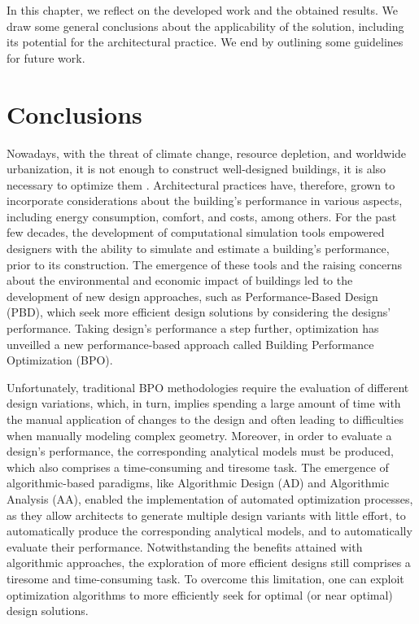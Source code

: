 \label{chap:conclusion}

In this chapter, we reflect on the developed work and the obtained results. We draw some general conclusions about the applicability of the solution, including its potential for the architectural practice. We end by outlining some guidelines for future work. 

\section{Conclusions}
Nowadays, with the threat of climate change, resource depletion, and worldwide urbanization, it is not enough to construct well-designed buildings, it is also necessary to optimize them \cite{Wortmann2015AdvSBO}. Architectural practices have, therefore, grown to incorporate considerations about the building's performance in various aspects, including energy consumption, comfort, and costs, among others. For the past few decades, the development of computational simulation tools empowered designers with the ability to simulate and estimate a building’s performance, prior to its construction. The emergence of these tools and the raising concerns about the environmental and economic impact of buildings led to the development of new design approaches, such as Performance-Based Design (\ac{PBD}), which seek more efficient design solutions by considering the designs’ performance. Taking design’s performance a step further, optimization has unveilled a new performance-based approach called Building Performance Optimization (\ac{BPO}). 

Unfortunately, traditional \ac{BPO} methodologies require the evaluation of different design variations, which, in turn, implies spending a large amount of time with the manual application of changes to the design and often leading to difficulties when manually modeling complex geometry. Moreover, in order to evaluate a design's performance, the corresponding analytical models must be produced, which also comprises a time-consuming and tiresome task. The emergence of algorithmic-based paradigms, like Algorithmic Design (\ac{AD}) and Algorithmic Analysis (\ac{AA}), enabled the implementation of automated optimization processes, as they allow architects to generate multiple design variants with little effort, to automatically produce the corresponding analytical models, and to automatically evaluate their performance. Notwithstanding the benefits attained with algorithmic approaches, the exploration of more efficient designs still comprises a tiresome and time-consuming task. To overcome this limitation, one can exploit optimization algorithms to more efficiently seek for optimal (or near optimal) design solutions.

